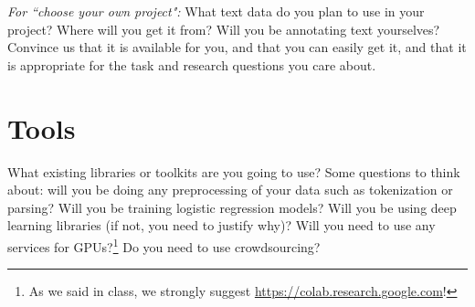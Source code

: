 \documentclass[11pt,a4paper]{article}
\begin{document}
\noindent\emph{For ``choose your own project":} 
What text data do you plan to use in your project? Where will you get it from? Will you be annotating text yourselves? Convince us that it is available for you, and that you can easily get it, and that it is appropriate for the task and research questions you care about.

\section{Tools}
What existing libraries or toolkits are you going to use? Some questions to think about: will you be doing any preprocessing of your data such as tokenization or parsing? Will you be training logistic regression models? Will you be using deep learning libraries (if not, you need to justify why)? Will you need to use any services for GPUs?\footnote{As we said in class, we strongly suggest \url{https://colab.research.google.com}!} Do you need to use crowdsourcing?


\footnotesize

\end{document}
